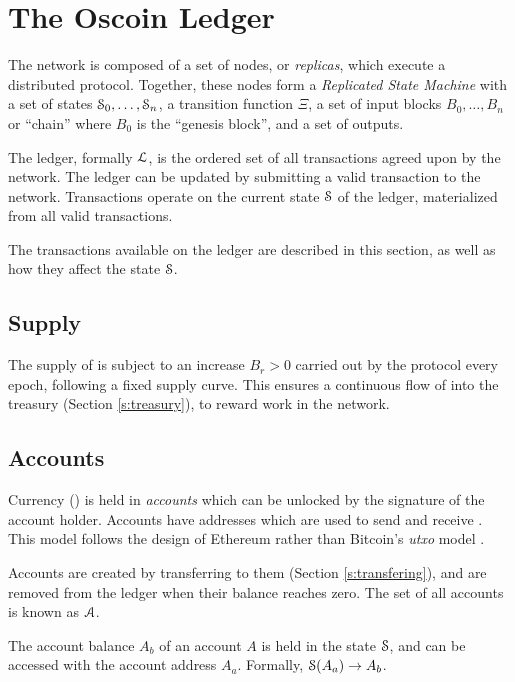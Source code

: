 \section{The Oscoin Ledger}
\label{s:ledger}

\def\posnat{\mathbb{N}_{\geq 1}}

The \oscoin{} network is composed of a set of nodes, or \emph{replicas}, which
execute a distributed protocol. Together, these nodes form a \emph{Replicated
State Machine} with a set of states $\mathcal{S}_0, \ldots, \mathcal{S}_n$, a transition
function $\Xi$, a set of input blocks $B_0, \ldots, B_n$ or ``chain'' where
$B_0$ is the ``genesis block'', and a set of outputs.

The \oscoin{} ledger, formally $\mathcal{L}$, is the ordered set of all
transactions agreed upon by the network. The ledger can be updated by submitting
a valid transaction to the network. Transactions operate on the current state
$\mathcal{S}$ of the ledger, materialized from all valid transactions.

The transactions available on the ledger are described in this section, as well
as how they affect the state $\mathcal{S}$.

\subsection{Supply}

The supply of \oscoin{} is subject to an increase $B_r > 0$ carried out by the
protocol every epoch, following a fixed supply curve. This ensures a continuous
flow of \oscoin{} into the treasury (Section \ref{s:treasury}), to reward work
in the network.

\subsection{Accounts}
\label{s:accounts}

Currency (\oscoin{}) is held in \emph{accounts} which can be unlocked by the
signature of the account holder. Accounts have addresses which are used to send
and receive \oscoin{}. This model follows the design of Ethereum \cite{ethereum}
rather than Bitcoin's \emph{utxo} model \cite{bitcoin}.

Accounts are created by transferring \oscoin{} to them (Section \ref{s:transfering}),
and are removed from the ledger when their balance reaches zero. The set of all
accounts is known as $\mathcal{A}$.

The account balance $A_b$ of an account $A$ is held in the state $\mathcal{S}$, and
can be accessed with the account address $A_a$. Formally, $\mathcal{S}(A_a) \to A_b$.

